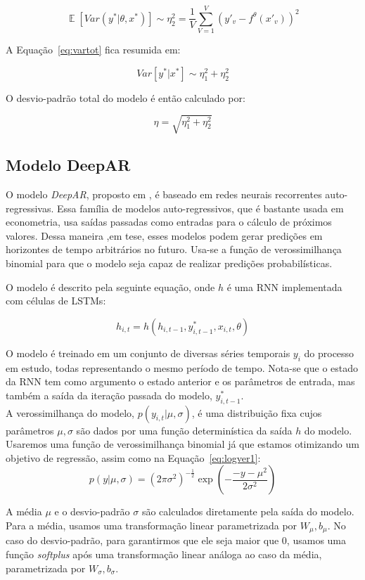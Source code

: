\[
  \mathop{\mathbb{E}}[Var(y^* | \theta,x^*)] \sim \eta_2^2 = \frac{1}{V}\sum^V_{V=1}(y'_v - f^\theta(x'_v))^2
\]



A Equação~\ref{eq:vartot} fica resumida em:


\[ Var[y^* | x^*] \sim \eta^2_1 + \eta^2_2 \] 

O desvio-padrão total do modelo é então calculado por:

\[
  \eta = \sqrt{\eta^2_1 + \eta^2_2}  
\]


\subsection{Modelo DeepAR}

O modelo \textit{DeepAR}, proposto em \citep{deepar}, é baseado em redes neurais
recorrentes auto-regressivas. Essa família de modelos auto-regressivos, que é bastante usada em
econometria, usa saídas passadas como entradas para o cálculo de próximos
valores. Dessa maneira ,em tese, esses modelos podem gerar predições em horizontes
de tempo arbitrários no futuro.
Usa-se a função de verossimilhança binomial para que o modelo seja capaz
de realizar predições probabilísticas.

O modelo é descrito pela seguinte equação, onde $h$ é uma RNN implementada com células de LSTMs:

\[
h_{i,t} = h(h_{i,t-1},y^*_{i,t-1},x_{i,t}, \theta)
\]

O modelo é treinado em um conjunto de diversas séries temporais $y_i$ do
processo em estudo, todas representando o mesmo período de tempo. Nota-se que o estado da RNN tem como argumento o estado anterior e os parâmetros de entrada, mas também a saída da iteração passada do modelo, $y^*_{i,t-1}$. \\

A verossimilhança do modelo, $p(y_{i,t} | \mu,\sigma)$, é uma distribuição fixa
cujos parâmetros $\mu, \sigma$ são dados por uma função determinística da saída $h$ do modelo. Usaremos uma função de verossimilhança binomial já que estamos otimizando um objetivo de regressão, assim como na Equação~\ref{eq:logver1}:
\[
  p(y | \mu,\sigma) = {(2\pi\sigma^2)}^{-\frac{1}{2}} \exp(-  \frac{-y - \mu^2}{2\sigma^2})  
\]

A média $\mu$ e o desvio-padrão $\sigma$ são calculados diretamente pela saída do modelo. Para a média, usamos uma transformação linear parametrizada por $W_{\mu},b_{\mu}$. No caso do desvio-padrão, para garantirmos que ele seja maior que 0, usamos uma função \textit{softplus} após uma transformação linear análoga ao caso da média, parametrizada por  $W_{\sigma},b_{\sigma}$.\\

